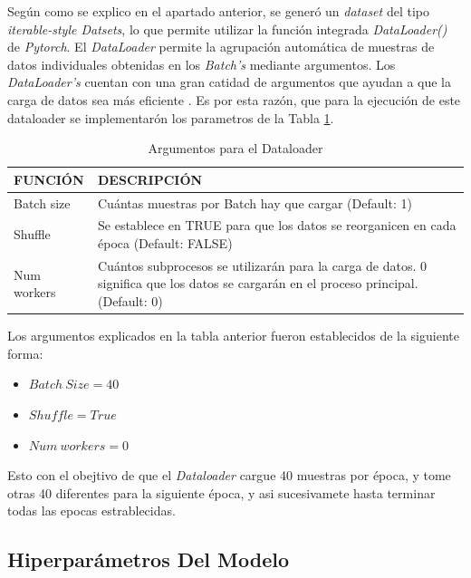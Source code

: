 			Según como se explico en el apartado anterior, se generó un \textit{dataset} del tipo \textit{iterable-style Datsets}, lo que permite utilizar la función integrada \textit{DataLoader()} de \textit{Pytorch}. El \textit{DataLoader} permite la agrupación automática de muestras de datos individuales obtenidas en los \textit{Batch's} mediante argumentos. Los \textit{DataLoader's} cuentan con una gran catidad de argumentos que ayudan a que la carga de datos sea más eficiente \cite{Pytorch}. Es por esta razón, que para la ejecución de este dataloader se implementarón los parametros de la Tabla \ref{table:Argumentos}.
			
			\begin{table}[ht]
				\centering
				\begin{tabular}{|p{3cm}|p{8cm}|}
					\hline
					FUNCIÓN & DESCRIPCIÓN \\ 
					\hline
					Batch size & Cuántas muestras por Batch hay que cargar (Default: 1)\\
					\hline
					Shuffle & Se establece en TRUE para que los datos se reorganicen en cada época (Default: FALSE)  \\
					\hline
					Num workers & Cuántos subprocesos se utilizarán para la carga de datos. 0 significa que los datos se cargarán en el proceso principal. (Default: 0)\\
					\hline
				\end{tabular}	
				\caption{Argumentos para el Dataloader}
				\label{table:Argumentos}
			\end{table}
		
		Los argumentos explicados en la tabla anterior fueron establecidos de la siguiente forma:
		
		\begin{itemize}
			\item $Batch \ Size = 40$
			\item $Shuffle = True$
			\item $Num \ workers = 0$
		\end{itemize}

		Esto con el obejtivo de que el \textit{Dataloader} cargue 40 muestras por época, y tome otras 40 diferentes para la siguiente época, y asi sucesivamete hasta terminar todas las epocas estrablecidas.  
		
		
		
			
		
		\subsection{Hiperparámetros Del Modelo}
		
